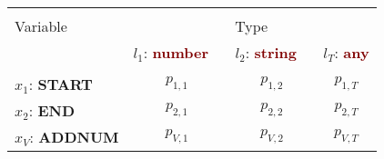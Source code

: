 \renewcommand{\arraystretch}{0.5}
\scriptsize
\begin{tabular}{@{}l@{\hskip 1mm} c@{\hskip 1mm} c@{\hskip 1mm} c@{}}
\toprule\\
Variable & \multicolumn{3}{c}{Type}\\ 
\cmidrule(l){2-4}
& $l_1$: \textbf{\textcolor{Maroon}{number}} \ & $l_2$: \textbf{\textcolor{Maroon}{string}} \ & $l_T$: \textbf{\textcolor{Maroon}{any}}\\ 
\midrule\\
$x_1$: \textbf{\textcolor{mygreen}{START}} & $p_{1,1}$ & $p_{1,2}$ & $p_{1,T}$\\
$x_2$: \textbf{\textcolor{mygreen}{END}} & $p_{2,1}$ & $p_{2,2}$ & $p_{2,T}$\\
$x_V$: \textbf{\textcolor{mygreen}{ADDNUM}} & $p_{V,1}$ & $p_{V,2}$ & $p_{V,T}$\\
\bottomrule
\end{tabular}